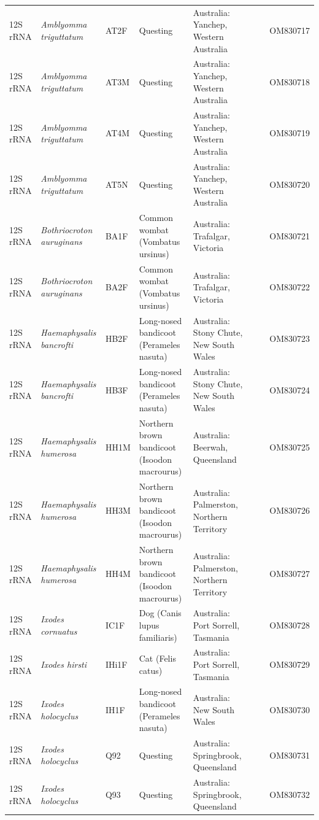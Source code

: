 \documentclass[a4paper, nobind]{templates/ociamthesis}
\begin{document}
\begin{landscape}
\begin{longtable}[t]{l>{}lllllll}
12S rRNA & \em{Amblyomma triguttatum} & AT2F & Questing & Australia: Yanchep, Western Australia &  &  & OM830717\\
12S rRNA & \em{Amblyomma triguttatum} & AT3M & Questing & Australia: Yanchep, Western Australia &  &  & OM830718\\
12S rRNA & \em{Amblyomma triguttatum} & AT4M & Questing & Australia: Yanchep, Western Australia &  &  & OM830719\\
12S rRNA & \em{Amblyomma triguttatum} & AT5N & Questing & Australia: Yanchep, Western Australia &  &  & OM830720\\
12S rRNA & \em{Bothriocroton auruginans} & BA1F & Common wombat (Vombatus ursinus) & Australia: Trafalgar, Victoria &  &  & OM830721\\
12S rRNA & \em{Bothriocroton auruginans} & BA2F & Common wombat (Vombatus ursinus) & Australia: Trafalgar, Victoria &  &  & OM830722\\
12S rRNA & \em{Haemaphysalis bancrofti} & HB2F & Long-nosed bandicoot (Perameles nasuta) & Australia: Stony Chute, New South Wales &  &  & OM830723\\
12S rRNA & \em{Haemaphysalis bancrofti} & HB3F & Long-nosed bandicoot (Perameles nasuta) & Australia: Stony Chute, New South Wales &  &  & OM830724\\
12S rRNA & \em{Haemaphysalis humerosa} & HH1M & Northern brown bandicoot (Isoodon macrourus) & Australia: Beerwah, Queensland &  &  & OM830725\\
12S rRNA & \em{Haemaphysalis humerosa} & HH3M & Northern brown bandicoot (Isoodon macrourus) & Australia: Palmerston, Northern Territory &  &  & OM830726\\
12S rRNA & \em{Haemaphysalis humerosa} & HH4M & Northern brown bandicoot (Isoodon macrourus) & Australia: Palmerston, Northern Territory &  &  & OM830727\\
12S rRNA & \em{Ixodes cornuatus} & IC1F & Dog (Canis lupus familiaris) & Australia: Port Sorrell, Tasmania &  &  & OM830728\\
12S rRNA & \em{Ixodes hirsti} & IHi1F & Cat (Felis catus) & Australia: Port Sorrell, Tasmania &  &  & OM830729\\
12S rRNA & \em{Ixodes holocyclus} & IH1F & Long-nosed bandicoot (Perameles nasuta) & Australia: New South Wales &  &  & OM830730\\
12S rRNA & \em{Ixodes holocyclus} & Q92 & Questing & Australia: Springbrook, Queensland &  &  & OM830731\\
12S rRNA & \em{Ixodes holocyclus} & Q93 & Questing & Australia: Springbrook, Queensland &  &  & OM830732\\

\end{longtable}
\end{landscape}
\end{document}
